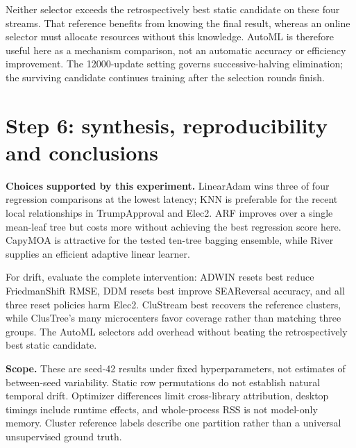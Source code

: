 \documentclass[10pt,a4paper]{article}
\begin{document}
Neither selector exceeds the retrospectively best static candidate on these four streams. That reference benefits from knowing the final result, whereas an online selector must allocate resources without this knowledge. AutoML is therefore useful here as a mechanism comparison, not an automatic accuracy or efficiency improvement. The 12000-update setting governs successive-halving elimination; the surviving candidate continues training after the selection rounds finish.
\clearpage
\section{Step 6: synthesis, reproducibility and conclusions}
\textbf{Choices supported by this experiment.} LinearAdam wins three of four regression comparisons at the lowest latency; KNN is preferable for the recent local relationships in TrumpApproval and Elec2. ARF improves over a single mean-leaf tree but costs more without achieving the best regression score here. CapyMOA is attractive for the tested ten-tree bagging ensemble, while River supplies an efficient adaptive linear learner.

For drift, evaluate the complete intervention: ADWIN resets best reduce FriedmanShift RMSE, DDM resets best improve SEAReversal accuracy, and all three reset policies harm Elec2. CluStream best recovers the reference clusters, while ClusTree's many microcenters favor coverage rather than matching three groups. The AutoML selectors add overhead without beating the retrospectively best static candidate.

\textbf{Scope.} These are seed-42 results under fixed hyperparameters, not estimates of between-seed variability. Static row permutations do not establish natural temporal drift. Optimizer differences limit cross-library attribution, desktop timings include runtime effects, and whole-process RSS is not model-only memory. Cluster reference labels describe one partition rather than a universal unsupervised ground truth.
\end{document}
